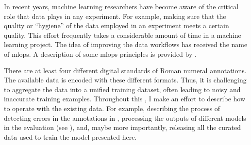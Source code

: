 

In recent years, machine learning researchers have become
aware of the critical role that data plays in any
experiment. For example, making sure that the quality or
``hygiene'' of the data employed in an experiment meets a
certain quality. This effort frequently takes a considerable
amount of time in a machine learning project. The idea of
improving the data workflows has received the name of
\gls{mlops}. A description of some \gls{mlops} principles is
provided by \textcite{renggli2021data}.

There are at least four different digital standards of Roman
numeral annotations. The available data is encoded with
these different formats. Thus, it is challenging to
aggregate the data into a unified training dataset, often
leading to noisy and inaccurate training examples.
Throughout this \thesisdiss{}, I make an effort to describe
how to operate with the existing data. For example,
describing the process of detecting errors in the
annotations in ,
processing the outputs of different models in the evaluation
(see ), and, maybe more
importantly, releasing all the curated data used to train
the model presented here.
